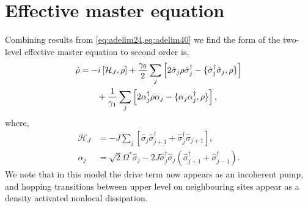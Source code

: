 \section{Effective master equation}

Combining results from \cref{eq:adelim24,eq:adelim40} we find the form of the two-level effective master equation to second order is,
\begin{align}
	\dot{\rho} &= -i\left[ \mathcal{H}_{J}, \rho \right] + \frac{\gamma_{0}}{2} \sum_{j}\left[2\hat{\sigma}_{j}\rho\hat{\sigma}_{j}^{\dagger} - \{\hat{\sigma}_{j}^{\dagger}\hat{\sigma}_{j}, \rho\} \right] \notag \\
	&\qquad + \frac{1}{\gamma_{1}} \sum_{j} \left[ 2\alpha_{j}^{\dagger}\rho\alpha_{j} - \{\alpha_{j}\alpha_{j}^{\dagger}, \rho \}\right],
	\label{eq:adelim41}
\end{align}
where,
\begin{align}
	\mathcal{H}_{J} &= -J \sum_{j} \left[\hat{\sigma}_{j}\hat{\sigma}_{j+1}^{\dagger} + \hat{\sigma}_{j}^{\dagger}\hat{\sigma}_{j+1}\right], \label{eq:adelim42} \\
	\alpha_{j} &= \sqrt{2}\Omega^{*}\hat{\sigma}_{j} - 2J\hat{\sigma}_{j}^{\dagger}\hat{\sigma}_{j}\left(\hat{\sigma}_{j+1}^{\dagger} + \hat{\sigma}_{j-1}^{\dagger}\right). \label{eq:adelim43}
\end{align}
We note that in this model the drive term now appears as an incoherent pump, and hopping transitions between upper level on neighbouring sites appear as a density activated nonlocal dissipation.